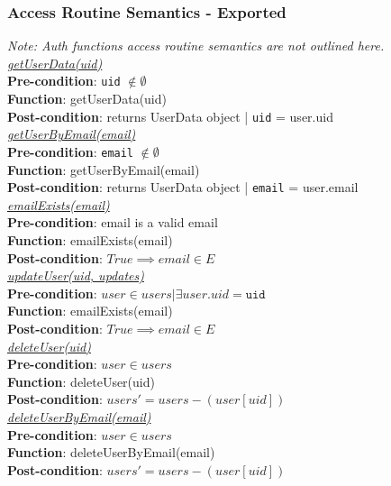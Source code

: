 \documentclass[12pt, titlepage]{article}
\begin{document}
\subsubsection{Access Routine Semantics - Exported}
\textit{Note: Auth functions access routine semantics are not outlined here.}\\
\underline{\textit{getUserData(uid)}}\\
\textbf{Pre-condition}: \texttt{uid} $\notin \emptyset$\\
\textbf{Function}: getUserData(uid)\\
\textbf{Post-condition}: returns UserData object | \texttt{uid} = user.uid\\

\noindent \underline{\textit{getUserByEmail(email)}}\\
\textbf{Pre-condition}: \texttt{email} $\notin \emptyset$\\
\textbf{Function}: getUserByEmail(email)\\
\textbf{Post-condition}: returns UserData object | \texttt{email} = user.email\\

\noindent\underline{\textit{emailExists(email)}}\\
\textbf{Pre-condition}: email is a valid email\\
\textbf{Function}: emailExists(email)\\
\textbf{Post-condition}: $True \implies email \in E$\\

\noindent\underline{\textit{updateUser(uid, updates)}}\\
\textbf{Pre-condition}: $user \in users | \exists user.uid = \texttt{uid}$\\
\textbf{Function}: emailExists(email)\\
\textbf{Post-condition}: $True \implies email \in E$\\

\noindent\underline{\textit{deleteUser(uid)}}\\
\textbf{Pre-condition}: $user \in users$ \\
\textbf{Function}: deleteUser(uid)\\
\textbf{Post-condition}: $users' = users - (user[uid])$\\

\noindent\underline{\textit{deleteUserByEmail(email)}}\\
\textbf{Pre-condition}: $user \in users$ \\
\textbf{Function}: deleteUserByEmail(email)\\
\textbf{Post-condition}: $users' = users - (user[uid])$\\
\end{document}
